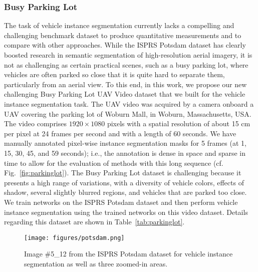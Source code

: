 \documentclass[journal]{IEEEtran}
\begin{document}
\subsubsection{\textbf{Busy Parking Lot}}
The task of vehicle instance segmentation currently lacks a compelling and challenging benchmark dataset to produce quantitative measurements and to compare with other approaches. While the ISPRS Potsdam dataset has clearly boosted research in semantic segmentation of high-resolution aerial imagery, it is not as challenging as certain practical scenes, such as a busy parking lot, where vehicles are often parked so close that it is quite hard to separate them, particularly from an aerial view. To this end, in this work, we propose our new challenging Busy Parking Lot UAV Video dataset that we built for the vehicle instance segmentation task.
The UAV video was acquired by a camera onboard a UAV covering the parking lot of Woburn Mall, in Woburn, Massachusetts, USA. The video comprises $1920\times1080$ pixels with a spatial resolution of about 15 cm per pixel at 24 frames per second and with a length of 60 seconds. We have manually annotated pixel-wise instance segmentation masks for 5 frames (at 1, 15, 30, 45, and 59 seconds); i.e., the annotation is dense in space and sparse in time to allow for the evaluation of methods with this long sequence (cf. Fig.~\ref{fig:parkinglot}). The Busy Parking Lot dataset is challenging because it presents a high range of variations, with a diversity of vehicle colors, effects of shadow, several slightly blurred regions, and vehicles that are parked too close. We train networks on the ISPRS Potsdam dataset and then perform vehicle instance segmentation using the trained networks on this video dataset. Details regarding this dataset are shown in Table~\ref{tab:parkinglot}.

\begin{figure}[t]
\centering
\texttt{[image: figures/potsdam.png]}
\renewcommand{\figurename}{Fig}
\caption{\label{fig:potsdam} Image \#5\_12 from the ISPRS Potsdam dataset for vehicle instance segmentation as well as three zoomed-in areas.}
\end{figure}
\end{document}
